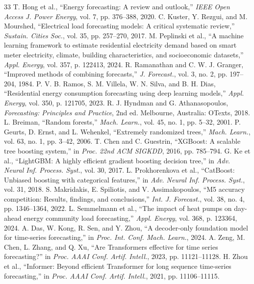 \documentclass[journal]{IEEEtran}
\begin{document}
\begin{thebibliography}{33}
 T. Hong et al., ``Energy forecasting: A review and outlook,'' \emph{IEEE Open Access J. Power Energy}, vol. 7, pp. 376--388, 2020.
 C. Kuster, Y. Rezgui, and M. Mourshed, ``Electrical load forecasting models: A critical systematic review,'' \emph{Sustain. Cities Soc.}, vol. 35, pp. 257--270, 2017.
 M. Peplinski et al., ``A machine learning framework to estimate residential electricity demand based on smart meter electricity, climate, building characteristics, and socioeconomic datasets,'' \emph{Appl. Energy}, vol. 357, p. 122413, 2024.
 R. Ramanathan and C. W. J. Granger, ``Improved methods of combining forecasts,'' \emph{J. Forecast.}, vol. 3, no. 2, pp. 197--204, 1984.
 P. V. B. Ramos, S. M. Villela, W. N. Silva, and B. H. Dias, ``Residential energy consumption forecasting using deep learning models,'' \emph{Appl. Energy}, vol. 350, p. 121705, 2023.
 R. J. Hyndman and G. Athanasopoulos, \emph{Forecasting: Principles and Practice}, 2nd ed. Melbourne, Australia: OTexts, 2018.
 L. Breiman, ``Random forests,'' \emph{Mach. Learn.}, vol. 45, no. 1, pp. 5--32, 2001.
 P. Geurts, D. Ernst, and L. Wehenkel, ``Extremely randomized trees,'' \emph{Mach. Learn.}, vol. 63, no. 1, pp. 3--42, 2006.
 T. Chen and C. Guestrin, ``XGBoost: A scalable tree boosting system,'' in \emph{Proc. 22nd ACM SIGKDD}, 2016, pp. 785--794.
 G. Ke et al., ``LightGBM: A highly efficient gradient boosting decision tree,'' in \emph{Adv. Neural Inf. Process. Syst.}, vol. 30, 2017.
 L. Prokhorenkova et al., ``CatBoost: Unbiased boosting with categorical features,'' in \emph{Adv. Neural Inf. Process. Syst.}, vol. 31, 2018.
 S. Makridakis, E. Spiliotis, and V. Assimakopoulos, ``M5 accuracy competition: Results, findings, and conclusions,'' \emph{Int. J. Forecast.}, vol. 38, no. 4, pp. 1346--1364, 2022.
 L. Semmelmann et al., ``The impact of heat pumps on day-ahead energy community load forecasting,'' \emph{Appl. Energy}, vol. 368, p. 123364, 2024.
 A. Das, W. Kong, R. Sen, and Y. Zhou, ``A decoder-only foundation model for time-series forecasting,'' in \emph{Proc. Int. Conf. Mach. Learn.}, 2024.
 A. Zeng, M. Chen, L. Zhang, and Q. Xu, ``Are Transformers effective for time series forecasting?'' in \emph{Proc. AAAI Conf. Artif. Intell.}, 2023, pp. 11121--11128.
 H. Zhou et al., ``Informer: Beyond efficient Transformer for long sequence time-series forecasting,'' in \emph{Proc. AAAI Conf. Artif. Intell.}, 2021, pp. 11106--11115.

\end{thebibliography}
\end{document}

